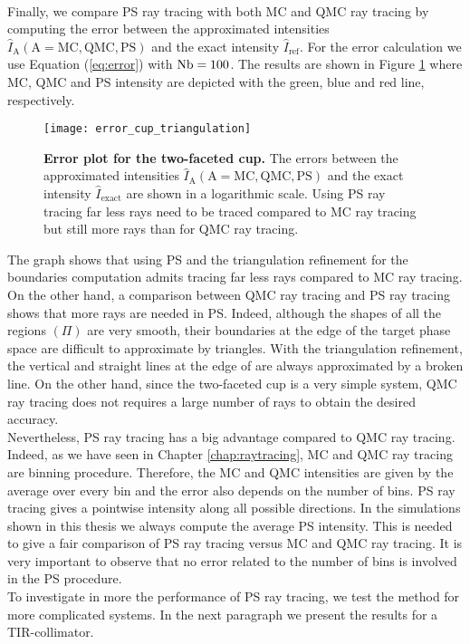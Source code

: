 \\ \indent 
Finally, we compare PS ray tracing with both MC and QMC ray tracing by computing the error between the approximated intensities $\hat{I}_{\textrm{A}}  (\textrm{A}= \textrm{MC}, \textrm{QMC}, \textrm{PS})$ and the exact intensity $\hat{I}_{\textrm{ref}}$. For the error calculation we use Equation (\ref{eq:error}) with $\textrm{Nb} = 100$. The results are shown in Figure \ref{fig:error_cup_triangulation} where MC, QMC and PS intensity are depicted with the green, blue and red line, respectively.
 \begin{figure}[h]
  \center
  \texttt{[image: error\_cup\_triangulation]}
  \caption{\textbf{Error plot for the two-faceted cup.} The errors between the approximated intensities $\hat{I}_{\textrm{A}} (\textrm{A}= \textrm{MC}, \textrm{QMC}, \textrm{PS})$ and the exact intensity $\hat{I}_{\textrm{exact}}$ are shown in a logarithmic scale. Using PS ray tracing far less rays need to be traced compared to MC ray tracing but still more rays than for QMC ray tracing.}
  \label{fig:error_cup_triangulation}
\end{figure}
The graph shows that using PS and the triangulation refinement for the boundaries computation admits tracing far less rays compared to MC ray tracing.
On the other hand, a comparison between QMC ray tracing and PS ray tracing shows that more rays are needed in PS. Indeed, although the shapes of all the regions $(\Pi)$ are very smooth, their boundaries at the edge of the target phase space  are difficult to approximate by triangles. With the triangulation refinement, the vertical and straight lines at the edge of  are always approximated by a broken line. On the other hand, since the two-faceted cup is a very simple system, QMC ray tracing does not requires a large number of rays to obtain the desired accuracy. \\ \indent Nevertheless, PS ray tracing has a big advantage compared to QMC ray tracing. Indeed, as we have seen in Chapter \ref{chap:raytracing}, MC and QMC ray tracing are binning procedure. Therefore, the MC and QMC intensities are given by the average over every bin and the error also depends on the number of bins. %
PS ray tracing gives a pointwise intensity along all possible directions. In the simulations shown in this thesis we always compute the average PS intensity. This is needed to give a fair comparison of PS ray tracing versus MC and QMC ray tracing. It is very important to observe that no error related to the number of bins is involved in the PS procedure. \\ \indent
To investigate in more the performance of PS ray tracing, we test the method for more complicated systems. In the next paragraph we present the results for a TIR-collimator. 

